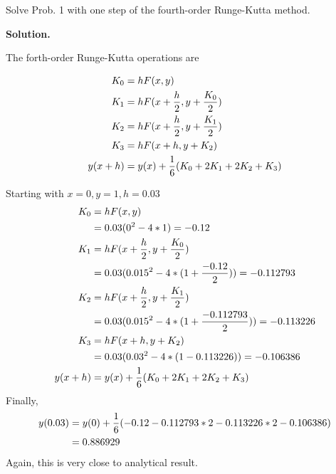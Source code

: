 \begin{exercise}{2} %
Solve Prob. 1 with one step of the fourth-order Runge-Kutta method.

\textbf{Solution.}

The forth-order Runge-Kutta operations are

\begin{align}
    K_0 &= hF(x, y) \notag \\
    K_1 &= hF(x+\frac{h}{2}, y+\frac{K_0}{2}) \notag \\
    K_2 &= hF(x+\frac{h}{2}, y+\frac{K_1}{2}) \notag \\
    K_3 &= hF(x+h, y+K_2) \notag \\
    y(x + h) &= y(x) + \frac{1}{6}(K_0 + 2K_1 + 2K_2 + K_3) \notag 
\end{align}

Starting with $x=0,y=1,h=0.03$
\begin{align}
    K_0 &= hF(x, y) \notag \\
        &=0.03(0^2-4*1) = -0.12 \notag \\
    K_1 &= hF(x+\frac{h}{2}, y+\frac{K_0}{2}) \notag \\
        &=0.03(0.015^2-4*(1+\frac{-0.12}{2})) = -0.112793 \notag \\
    K_2 &= hF(x+\frac{h}{2}, y+\frac{K_1}{2}) \notag \\
        &=0.03(0.015^2-4*(1+\frac{-0.112793}{2})) = -0.113226 \notag \\
    K_3 &= hF(x+h, y+K_2) \notag \\
        &= 0.03(0.03^2-4*(1-0.113226)) = -0.106386 \notag \\
    y(x + h) &= y(x) + \frac{1}{6}(K_0 + 2K_1 + 2K_2 + K_3) \notag
\end{align}
Finally,
\begin{align}
    y(0.03) &= y(0) + \frac{1}{6}(-0.12 -0.112793*2 -0.113226*2 -0.106386) \notag \\
    &=0.886929 \notag
\end{align}
Again, this is very close to analytical result.

\end{exercise}


